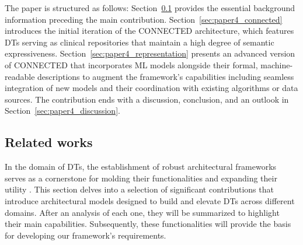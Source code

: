 The paper is structured as follows: Section~\ref{sec:paper4_related_works} provides the essential background information preceding the main contribution. 
Section~\ref{sec:paper4_connected} introduces the initial iteration of the CONNECTED architecture, which features DTs serving as clinical repositories that maintain a high degree of semantic expressiveness. Section~\ref{sec:paper4_representation} presents an advanced version of CONNECTED that incorporates ML models alongside their formal, machine-readable descriptions to augment the framework's capabilities including seamless integration of new models and their coordination with existing algorithms or data sources.
The contribution ends with a discussion, conclusion, and an outlook in Section~\ref{sec:paper4_discussion}.

\subsection{Related works}\label{sec:paper4_related_works}

In the domain of DTs, the establishment of robust architectural frameworks serves as a cornerstone for molding their functionalities and expanding their utility \cite{wang_mobility_2022}. This section delves into a selection of significant contributions that introduce architectural models designed to build and elevate DTs across different domains. After an analysis of each one, they will be summarized to highlight their main capabilities.
Subsequently, these functionalities will provide the basis for developing our framework’s requirements.

